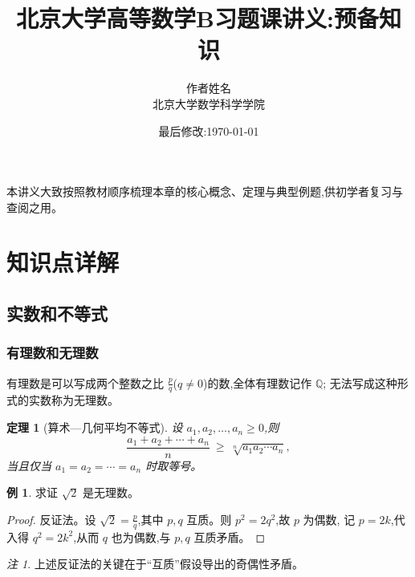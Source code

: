 \documentclass[11pt]{ctexart}
\title{\heiti 北京大学高等数学B习题课讲义:预备知识}
\author{作者姓名 \\ 北京大学数学科学学院}
\date{最后修改:\today}
\theoremstyle{plain}
\newtheorem{theorem}{定理}[section]
\theoremstyle{definition}
\newtheorem{example}{例}            %
\theoremstyle{remark}
\newtheorem*{remark}{注}
\newcommand{\Q}{\mathbb{Q}}
\begin{document}
\maketitle

本讲义大致按照教材顺序梳理本章的核心概念、定理与典型例题,供初学者复习与查阅之用。


\section{知识点详解}

\subsection{实数和不等式}

\subsubsection*{有理数和无理数}

有理数是可以写成两个整数之比 $\frac{p}{q}$($q\neq 0$)的数,全体有理数记作 $\Q$;
无法写成这种形式的实数称为无理数。

\begin{theorem}[算术—几何平均不等式]
设 $a_1,a_2,\dots,a_n\ge 0$,则
\begin{equation}
  \frac{a_1+a_2+\cdots+a_n}{n}\ \ge\ \sqrt[n]{a_1 a_2\cdots a_n},
\end{equation}
当且仅当 $a_1=a_2=\cdots=a_n$ 时取等号。
\end{theorem}

\begin{example}
求证 $\sqrt{2}$ 是无理数。
\end{example}

\begin{proof}
反证法。设 $\sqrt{2}=\frac{p}{q}$,其中 $p,q$ 互质。则 $p^2=2q^2$,故 $p$ 为偶数,
记 $p=2k$,代入得 $q^2=2k^2$,从而 $q$ 也为偶数,与 $p,q$ 互质矛盾。
\end{proof}

\begin{remark}
上述反证法的关键在于“互质”假设导出的奇偶性矛盾。
\end{remark}

\end{document}

